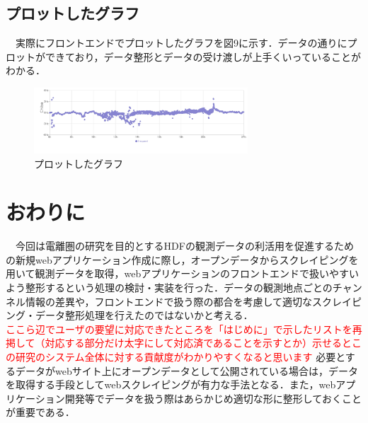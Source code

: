 
 
\subsection{プロットしたグラフ}
　実際にフロントエンドでプロットしたグラフを図9に示す．データの通りにプロットができており，データ整形とデータの受け渡しが上手くいっていることがわかる．\\
 \begin{figure}[ht]
   \centering
   \includegraphics[width=80mm]{fig/graph.png}
      \caption{プロットしたグラフ}
 \end{figure}



\section{おわりに}
　今回は電離圏の研究を目的とするHDFの観測データの利活用を促進するための新規webアプリケーション作成に際し，オープンデータからスクレイピングを用いて観測データを取得，webアプリケーションのフロントエンドで扱いやすいよう整形するという処理の検討・実装を行った．データの観測地点ごとのチャンネル情報の差異や，フロントエンドで扱う際の都合を考慮して適切なスクレイピング・データ整形処理を行えたのではないかと考える．\\
\textcolor{red}{ここら辺でユーザの要望に対応できたところを「はじめに」で示したリストを再掲して（対応する部分だけ太字にして対応済であることを示すとか）示せるとこの研究のシステム全体に対する貢献度がわかりやすくなると思います}
 必要とするデータがwebサイト上にオープンデータとして公開されている場合は，データを取得する手段としてwebスクレイピングが有力な手法となる．また，webアプリケーション開発等でデータを扱う際はあらかじめ適切な形に整形しておくことが重要である．\\
　

